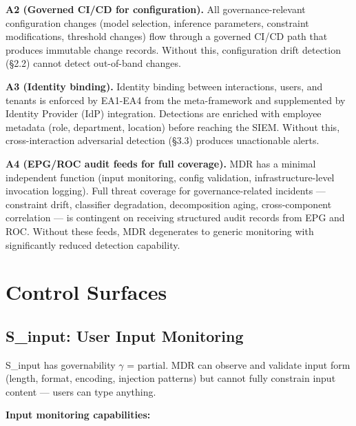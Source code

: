 \textbf{A2 (Governed CI/CD for configuration).} All governance-relevant configuration changes (model selection, inference parameters, constraint modifications, threshold changes) flow through a governed CI/CD path that produces immutable change records. Without this, configuration drift detection (\S{}2.2) cannot detect out-of-band changes.

\textbf{A3 (Identity binding).} Identity binding between interactions, users, and tenants is enforced by EA1-EA4 from the meta-framework and supplemented by Identity Provider (IdP) integration. Detections are enriched with employee metadata (role, department, location) before reaching the SIEM. Without this, cross-interaction adversarial detection (\S{}3.3) produces unactionable alerts.

\textbf{A4 (EPG/ROC audit feeds for full coverage).} MDR has a minimal independent function (input monitoring, config validation, infrastructure-level invocation logging). Full threat coverage for governance-related incidents --- constraint drift, classifier degradation, decomposition aging, cross-component correlation --- is contingent on receiving structured audit records from EPG and ROC. Without these feeds, MDR degenerates to generic monitoring with significantly reduced detection capability.



\section{Control Surfaces}
\label{sec:monitoring-2}


\subsection{S\_input: User Input Monitoring}


S\_\allowbreak{}input has governability $\gamma$ = partial. MDR can observe and validate input form (length, format, encoding, injection patterns) but cannot fully constrain input content --- users can type anything.

\textbf{Input monitoring capabilities:}

